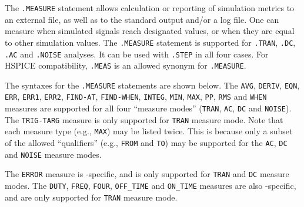 

\label{Measure_section}

The \texttt{.MEASURE} statement allows calculation or reporting of simulation 
metrics to an external file, as well as to the standard output and/or a log file.  One can 
measure when simulated signals reach designated values, or when they are equal
to other simulation values.  The \texttt{.MEASURE} statement is supported for 
\texttt{.TRAN}, \texttt{.DC}, \texttt{.AC} and \texttt{.NOISE} analyses.  It can
be used with {\tt .STEP}  in all four cases.  For HSPICE compatibility,
\texttt{.MEAS} is an allowed synonym for \texttt{.MEASURE}.

The syntaxes for the \texttt{.MEASURE} statements are shown below.  The \texttt{AVG},
\texttt{DERIV}, \texttt{EQN},   \texttt{ERR},  \texttt{ERR1}, \texttt{ERR2}, \texttt{FIND-AT},
\texttt{FIND-WHEN}, \texttt{INTEG}, \texttt{MIN}, \texttt{MAX}, \texttt{PP}, \texttt{RMS}
and \texttt{WHEN} measures are supported for all four ``measure modes'' (\texttt{TRAN}, 
\texttt{AC}, \texttt{DC} and \texttt{NOISE}).  The \texttt{TRIG-TARG} measure is only supported for
\texttt{TRAN} measure mode.  Note that each measure type (e.g., \texttt{MAX}) may be listed
twice. This is because only a subset of the allowed ``qualifiers'' (e.g., \texttt{FROM} and
\texttt{TO}) may be supported for the \texttt{AC}, \texttt{DC} and \texttt{NOISE} measure modes.

The \texttt{ERROR} measure is \Xyce{}-specific, and is only supported for \texttt{TRAN} and
\texttt{DC} measure modes.  The \texttt{DUTY}, \texttt{FREQ}, \texttt{FOUR}, \texttt{OFF\_TIME}
and \texttt{ON\_TIME} measures are also \Xyce{}-specific, and are  only supported for
\texttt{TRAN} measure mode.

